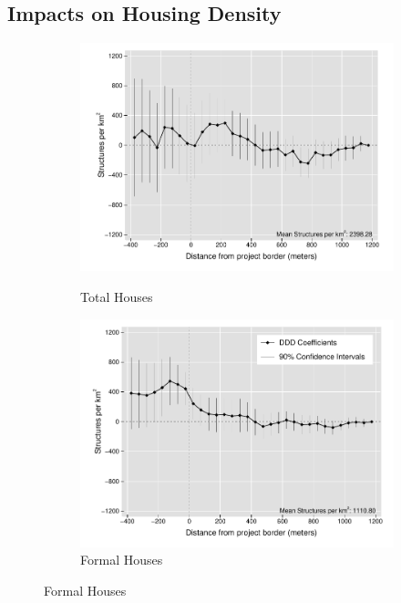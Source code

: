 \documentclass[12pt]{article}
\begin{document}
\subsection{Impacts on Housing Density}\label{section:bbluestimates}

\begin{figure}[t!]
        \centering
        \vspace{2mm}
        \begin{subfigure}[b]{0.49\textwidth}
            \centering
            \caption[]{\small Total Houses}  
            \vspace{-1mm}
            \includegraphics[width=\textwidth,trim={.5cm .3cm .3cm 0cm}, clip=true]{figures/distplotDDD_bblu_total_buildings_admin}
            \label{fig:DDDtotal}
        \end{subfigure}
        \hfill
        \begin{subfigure}[b]{0.49\textwidth}  
            \centering 
            \caption[]{\small Formal Houses}
            \vspace{-1mm}
            \includegraphics[width=\textwidth,trim={.5cm .3cm .3cm 0cm}, clip=true]{figures/distplotDDD_bblu_for_admin}     

\end{subfigure}
\end{figure}
\end{document}
